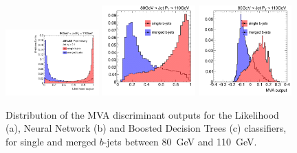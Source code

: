 \begin{figure}[tp]
\centering
\includegraphics[width=0.32\textwidth]{FIGS/Likelihood/NNoutput080_LihoodKDE.pdf}
\includegraphics[width=0.32\textwidth]{FIGS/TEMPFigs/MVA_differentMethods/bins/NNoutput080_MLP.pdf}
\includegraphics[width=0.32\textwidth]{FIGS/TEMPFigs/MVA_differentMethods/bins/NNoutput080_BDT.pdf}
\caption{Distribution of the MVA discriminant outputs for the Likelihood (a), Neural Network (b) and Boosted Decision Trees (c) classifiers, for single and merged $b$-jets between 80~GeV and 110~GeV.}
\label{fig:diffmethodsBins}
\end{figure}


